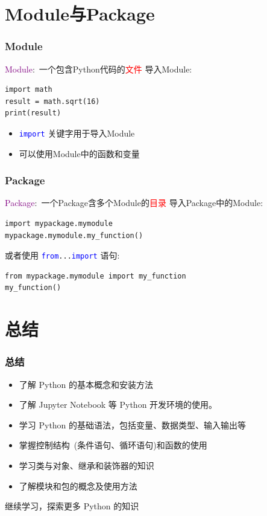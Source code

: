 \section{\rm{Module}与\rm{Package}}
\begin{frame}[fragile]
	\frametitle{\textrm{Module}}
	\textcolor{purple}{\textrm{Module}}:~一个包含\textrm{Python}代码的\textcolor{red}{文件}
\vskip 2pt
    导入\textrm{Module}:~
    \begin{lstlisting}[style=pythonstyle]
import math
result = math.sqrt(16)
print(result)
    \end{lstlisting}
    \begin{itemize}
	    \item \texttt{\textcolor{blue}{import}} 关键字用于导入\textrm{Module}
	    \item 可以使用\textrm{Module}中的函数和变量
    \end{itemize}
\end{frame}
%
\begin{frame}[fragile]
	\frametitle{\textrm{Package}}
	\textcolor{purple}{\textrm{Package}}:~一个\textrm{Package}含多个\textrm{Module}的\textcolor{red}{目录}
\vskip 2pt
	导入\textrm{Package}中的\textrm{Module}:
    \begin{lstlisting}[style=pythonstyle]
import mypackage.mymodule
mypackage.mymodule.my_function()
    \end{lstlisting}
    或者使用 \texttt{\textcolor{blue}{from}...\textcolor{blue}{import}} 语句:
    \begin{lstlisting}[style=pythonstyle]
from mypackage.mymodule import my_function
my_function()
    \end{lstlisting}
\end{frame}
%
\section{总结}
\begin{frame}
    \frametitle{总结}
    \begin{itemize}
	    \item 了解 \textrm{Python} 的基本概念和安装方法
	    \item 了解 \textrm{Jupyter Notebook} 等 \textrm{Python} 开发环境的使用。
	    \item 学习 \textrm{Python} 的基础语法，包括变量、数据类型、输入输出等
        \item 掌握控制结构~(条件语句、循环语句)和函数的使用
        \item 学习类与对象、继承和装饰器的知识
        \item 了解模块和包的概念及使用方法
    \end{itemize}
    继续学习，探索更多 \textrm{Python} 的知识
\end{frame}
%
